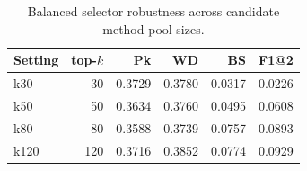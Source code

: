 \begin{table}[t]
\centering
\small
\caption{Balanced selector robustness across candidate method-pool sizes.}
\label{tab:selector_robustness}
\begin{tabular}{lrrrrr}
\toprule
Setting & top-$k$ & Pk & WD & BS & F1@2 \\
\midrule
k30 & 30 & 0.3729 & 0.3780 & 0.0317 & 0.0226 \\
k50 & 50 & 0.3634 & 0.3760 & 0.0495 & 0.0608 \\
k80 & 80 & 0.3588 & 0.3739 & 0.0757 & 0.0893 \\
k120 & 120 & 0.3716 & 0.3852 & 0.0774 & 0.0929 \\
\bottomrule
\end{tabular}
\end{table}